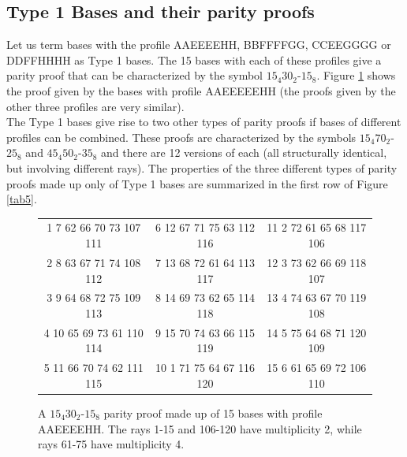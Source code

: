 {\bf \subsection{\label{subsec:type1} Type 1 Bases and their parity proofs }}

Let us term bases with the profile AAEEEEHH, BBFFFFGG, CCEEGGGG or DDFFHHHH as Type 1 bases. The 15 bases with each of these profiles give a parity proof that can be characterized by the symbol $15_{4}30_{2}$-$15_{8}$. Figure \ref{tab4} shows the proof given by the bases with profile AAEEEEEHH (the proofs given by the other three profiles are very similar).\\

The Type 1 bases give rise to two other types of parity proofs if bases of different profiles can be combined. These proofs are characterized by the symbols $15_{4}70_{2}$-$25_{8}$ and $45_{4}50_{2}$-$35_{8}$ and there are 12 versions of each (all structurally identical, but involving different rays). The properties of the three different types of parity proofs made up only of Type 1 bases are summarized in the first row of Figure \ref{tab5}. \\

\begin{figure}[ht]
\centering %
\begin{tabular}{|c | c |c |} %
\hline %
1	7	62	66	70	73	107	111&6	12	67	71	75	63	112	116&11	2	72	61	65	68	117	106\\
2	8	63	67	71	74	108	112&7	13	68	72	61	64	113	117&12	3	73	62	66	69	118	107\\
3	9	64	68	72	75	109	113&8	14	69	73	62	65	114	118&13	4	74	63	67	70	119	108\\
4	10	65	69	73	61	110	114&9	15	70	74	63	66	115	119&14	5	75	64	68	71	120	109\\
5	11	66	70	74	62	111	115&10	1	71	75	64	67	116	120&15	6	61	65	69	72	106	110\\
\hline
\end{tabular}
\caption{A $15_{4}30_{2}$-$15_{8}$ parity proof made up of 15 bases with profile AAEEEEHH. The rays 1-15 and 106-120 have multiplicity 2, while rays 61-75 have multiplicity 4.}
\label{tab4}
\end{figure}

